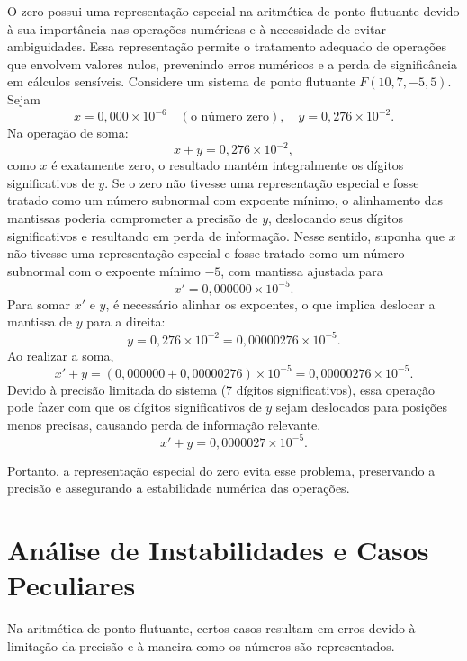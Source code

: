 O zero possui uma representação especial na aritmética de ponto flutuante
devido à sua importância nas operações numéricas e à necessidade de evitar
ambiguidades. Essa representação permite o tratamento adequado de operações que
envolvem valores nulos, prevenindo erros numéricos e a perda de significância
em cálculos sensíveis. Considere um sistema de ponto flutuante \( F(10, 7, -5,
5) \). Sejam
\[
  x = 0{,}000 \times 10^{-6} \quad (\text{o número zero}), \quad y = 0{,}276 \times 10^{-2}.
\]
Na operação de soma:
\[
  x + y = 0{,}276 \times 10^{-2},
\]
como \( x \) é exatamente zero, o resultado mantém integralmente os dígitos
significativos de \( y \). Se o zero não tivesse uma representação especial e
fosse tratado como um número subnormal com expoente mínimo, o alinhamento das
mantissas poderia comprometer a precisão de \( y \), deslocando seus dígitos
significativos e resultando em perda de informação. Nesse sentido, suponha que
\( x \) não tivesse uma representação especial e fosse tratado como um número
subnormal com o expoente mínimo \( -5 \), com mantissa ajustada para
\[
  x' = 0{,}000000 \times 10^{-5}.
\]
Para somar \( x' \) e \( y \), é necessário alinhar os expoentes, o que implica
deslocar a mantissa de \( y \) para a direita:
\[
  y = 0{,}276 \times 10^{-2} = 0{,}00000276 \times 10^{-5}.
\]
Ao realizar a soma,
\[
  x' + y = (0{,}000000 + 0{,}00000276) \times 10^{-5} = 0{,}00000276 \times 10^{-5}.
\]
Devido à precisão limitada do sistema (7 dígitos significativos), essa operação
pode fazer com que os dígitos significativos de \( y \) sejam deslocados para
posições menos precisas, causando perda de informação relevante.
\[
  x' + y = 0{,}0000027 \times 10^{-5}.
\]

Portanto, a representação especial do zero evita esse problema, preservando a
precisão e assegurando a estabilidade numérica das operações.

\section{Análise de Instabilidades e Casos Peculiares}
Na aritmética de ponto flutuante, certos casos resultam em erros devido à
limitação da precisão e à maneira como os números são representados.

